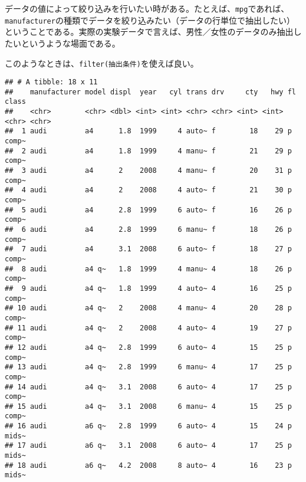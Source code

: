 \documentclass[]{book}
\newenvironment{Shaded}{\begin{snugshade}}{\end{snugshade}}
\newcommand{\KeywordTok}[1]{\textcolor[rgb]{0.13,0.29,0.53}{\textbf{#1}}}
\newcommand{\StringTok}[1]{\textcolor[rgb]{0.31,0.60,0.02}{#1}}
\newcommand{\CommentTok}[1]{\textcolor[rgb]{0.56,0.35,0.01}{\textit{#1}}}
\newcommand{\OperatorTok}[1]{\textcolor[rgb]{0.81,0.36,0.00}{\textbf{#1}}}
\newcommand{\NormalTok}[1]{#1}
\begin{document}
データの値によって絞り込みを行いたい時がある。たとえば、\texttt{mpg}であれば、\texttt{manufacturer}の種類でデータを絞り込みたい（データの行単位で抽出したい）ということである。実際の実験データで言えば、男性／女性のデータのみ抽出したいというような場面である。

このようなときは、\texttt{filter(抽出条件)}を使えば良い。

\begin{Shaded}
\end{Shaded}

\begin{verbatim}
## # A tibble: 18 x 11
##    manufacturer model displ  year   cyl trans drv     cty   hwy fl    class
##    <chr>        <chr> <dbl> <int> <int> <chr> <chr> <int> <int> <chr> <chr>
##  1 audi         a4      1.8  1999     4 auto~ f        18    29 p     comp~
##  2 audi         a4      1.8  1999     4 manu~ f        21    29 p     comp~
##  3 audi         a4      2    2008     4 manu~ f        20    31 p     comp~
##  4 audi         a4      2    2008     4 auto~ f        21    30 p     comp~
##  5 audi         a4      2.8  1999     6 auto~ f        16    26 p     comp~
##  6 audi         a4      2.8  1999     6 manu~ f        18    26 p     comp~
##  7 audi         a4      3.1  2008     6 auto~ f        18    27 p     comp~
##  8 audi         a4 q~   1.8  1999     4 manu~ 4        18    26 p     comp~
##  9 audi         a4 q~   1.8  1999     4 auto~ 4        16    25 p     comp~
## 10 audi         a4 q~   2    2008     4 manu~ 4        20    28 p     comp~
## 11 audi         a4 q~   2    2008     4 auto~ 4        19    27 p     comp~
## 12 audi         a4 q~   2.8  1999     6 auto~ 4        15    25 p     comp~
## 13 audi         a4 q~   2.8  1999     6 manu~ 4        17    25 p     comp~
## 14 audi         a4 q~   3.1  2008     6 auto~ 4        17    25 p     comp~
## 15 audi         a4 q~   3.1  2008     6 manu~ 4        15    25 p     comp~
## 16 audi         a6 q~   2.8  1999     6 auto~ 4        15    24 p     mids~
## 17 audi         a6 q~   3.1  2008     6 auto~ 4        17    25 p     mids~
## 18 audi         a6 q~   4.2  2008     8 auto~ 4        16    23 p     mids~
\end{verbatim}
\end{document}
